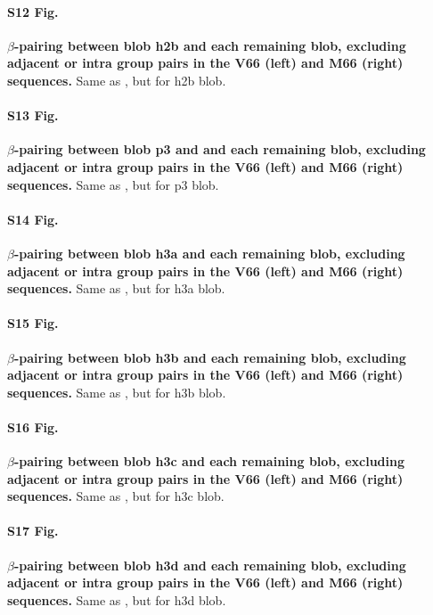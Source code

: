 \documentclass[10pt,letterpaper]{article}
\begin{document}
\paragraph*{S12 Fig.}
\label{S12_Fig}
{\bf $\beta$-pairing between blob h2b and each remaining blob, excluding adjacent or intra group pairs in the V66 (left) and M66 (right) sequences.} Same as , but for h2b blob.

\paragraph*{S13 Fig.}
\label{S13_Fig}
{\bf $\beta$-pairing between blob p3 and and each remaining blob, excluding adjacent or intra group pairs in the V66 (left) and M66 (right) sequences.} Same as , but for p3 blob.

\paragraph*{S14 Fig.}
\label{S14_Fig}
{\bf $\beta$-pairing between blob h3a and each remaining blob, excluding adjacent or intra group pairs in the V66 (left) and M66 (right) sequences.} Same as , but for h3a blob.

\paragraph*{S15 Fig.}
\label{S15_Fig}
{\bf $\beta$-pairing between blob h3b and each remaining blob, excluding adjacent or intra group pairs in the V66 (left) and M66 (right) sequences.} Same as , but for h3b blob.

\paragraph*{S16 Fig.}
\label{S16_Fig}
{\bf $\beta$-pairing between blob h3c and each remaining blob, excluding adjacent or intra group pairs in the V66 (left) and M66 (right) sequences.} Same as , but for h3c blob.

\paragraph*{S17 Fig.}
\label{S17_Fig}
{\bf $\beta$-pairing between blob h3d and each remaining blob, excluding adjacent or intra group pairs in the V66 (left) and M66 (right) sequences.} Same as , but for h3d blob.

%
%


\end{document}
